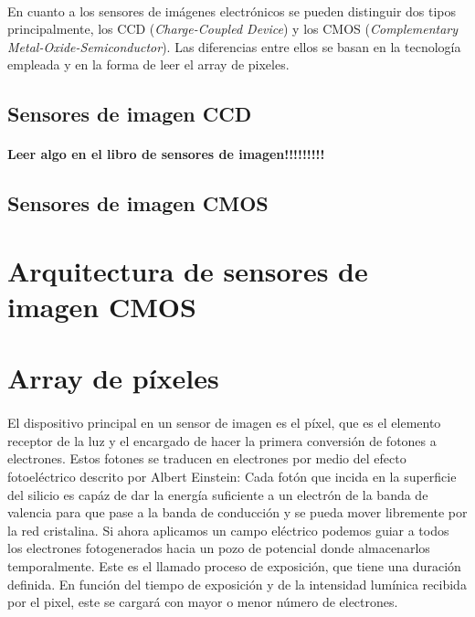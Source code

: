 \paragraph{}
En cuanto a los sensores de imágenes electrónicos se pueden distinguir dos tipos
principalmente, los CCD (\textit{Charge-Coupled Device}) y los CMOS
(\textit{Complementary Metal-Oxide-Semiconductor}). Las diferencias entre ellos
se basan en la tecnología empleada y en la forma de leer el array de pixeles.

\subsection{Sensores de imagen CCD}

\paragraph{}
{\huge\textbf{Leer algo en el libro de sensores de imagen!!!!!!!!!}}

\subsection{Sensores de imagen CMOS}

\paragraph{}


\section{Arquitectura de sensores de imagen CMOS}

\section{Array de píxeles}

\paragraph{}
El dispositivo principal en un sensor de imagen es el píxel, que es el elemento
receptor de la luz y el encargado de hacer la primera conversión de fotones a
electrones. Estos fotones se traducen en electrones por medio del efecto fotoeléctrico
descrito por Albert Einstein: Cada fotón que incida en la superficie del silicio
es capáz de dar la energía suficiente a un electrón de la banda de valencia para que
pase a la banda de conducción y se pueda mover libremente por la red cristalina.
Si ahora aplicamos un campo eléctrico podemos guiar a todos los electrones
fotogenerados hacia un pozo de potencial donde almacenarlos temporalmente. Este
es el llamado proceso de exposición, que tiene una duración definida. En función
del tiempo de exposición y de la intensidad lumínica recibida por el pixel, este
se cargará con mayor o menor número de electrones.

